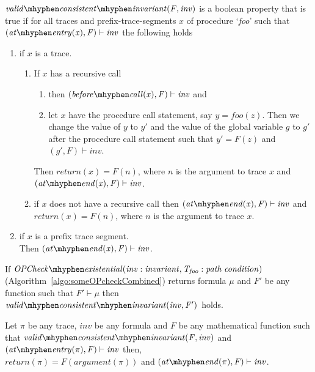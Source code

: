 \documentclass{llncs}
\newcommand{\foo}{\textit{foo}}
\newcommand{\trace}{\pi}
\newcommand{\inv}{\mathit{inv}}
\newcommand{\pathCondition}{\mathit{T_{\foo}}}
\newcommand{\OPCheckE}{\mathit{OPCheck \mhyphen existential}}
\newcommand{\mi}[1]{\mathit{#1}}
\newcommand{\F}{\mathit{F}}
\newcommand{\n}{\textit{n}}
\newcommand{\g}{\textit{g}}
\newcommand{\satisfies}{\vdash}
\newcommand{\formula}{\mu}
\newcommand{\vci}[2]{\mathit{valid \mhyphen consistent \mhyphen
    invariant(#1, #2)}}
\newcommand{\atEntry}[1]{\mathit{at \mhyphen entry(#1)}}
\newcommand{\beforeCall}[1]{\mathit{before \mhyphen call(#1)}}
\newcommand{\return}[1]{\mathit{return(#1)}}
\newcommand{\atEnd}[1]{\mathit{at \mhyphen end(#1)}}
\newcommand{\param}[1]{\mathit{argument(#1)}}
\begin{document}
\begin{definition}
  \label{def:validConsistentInvariant}
  $\\\vci{\F}{\inv}$ is a boolean property that is true if for all
  traces and prefix-trace-segments $x$ of procedure `\foo' such that
  $(\atEntry{x}, \F) \satisfies \inv$ the following holds

  \begin{enumerate}
  \item if $x$ is a trace.
    \begin{enumerate}
    \item If $x$ has a recursive call
      \begin{enumerate}
      \item then $(\beforeCall{x}, \F) \satisfies \inv$ and
      \item let $x$ have the procedure call statement, say $y =
        \foo(z)$. Then we change the value of $y$ to $y'$ and the
        value of the global variable $\g$ to $g'$ after the procedure
        call statement such that $y' = \F(z)$ and $(g', \F)
        \satisfies \inv$.
      \end{enumerate}
      Then $\return{x} = \F(\n)$, where $\n$ is the argument to
      trace $x$ and $(\atEnd{x}, \F) \satisfies \inv$.
    \item if $x$ does not have a recursive call
      then $(\atEnd{x}, \F) \satisfies \inv$ and $\return{x} =
      \F(\n)$, where $\n$ is the argument to trace $x$.
    \end{enumerate}
  \item if $x$ is a prefix trace segment.\\
    Then $(\atEnd{x}, \F) \satisfies \inv$.
  \end{enumerate}
\end{definition}

\begin{lemma}\label{lemma:interface}
  If $\OPCheckE\mi{(\inv : invariant, \pathCondition : path \;
    condition)}$ (Algorithm~\ref{algo:someOPcheckCombined}) returns
  formula $\formula$ and $\F'$ be any function such that $\F'
  \satisfies \formula$ then\\ $\vci{\inv}{\F'}$ holds.
\end{lemma}


\begin{lemma} \label{lemma:trace}
Let $\trace$ be any trace, $\inv$ be any formula and $\F$ be any
mathematical function such that $\vci{\F}{\inv}$ and
$(\atEntry{\trace}, \F) \satisfies \inv$ then,\\ $\return{\trace} =
\F(\param{\trace})$ and $(\atEnd{\trace}, \F) \satisfies \inv$.
\end{lemma}
\end{document}
